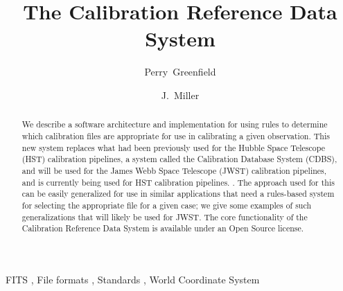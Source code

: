 \documentclass[final,authoryear,5p,times,twocolumn]{elsarticle}
\begin{document}
\begin{frontmatter}



\title{The Calibration Reference Data System}



\author[stsci]{Perry~Greenfield}
\author[stsci]{J.~Miller}

\address[stsci]{Space Telescope Science Institute, 3700 San Martin Drive, Baltimore, MD 21218, USA}

\begin{abstract}

We describe a software architecture and implementation for using rules to
determine which calibration files are appropriate for use in calibrating a
given observation. This new system replaces what had been previously used for
the Hubble Space Telescope (HST) calibration pipelines, a system called the
Calibration Database System (CDBS), and will be used for the James Webb Space
Telescope (JWST) calibration pipelines, and is currently being used for HST calibration pipelines. . The approach used for this can be
easily generalized for use in similar applications that need a rules-based
system for selecting the appropriate file for a given case; we give some
examples of such generalizations that will likely be used for JWST. The core
functionality of the Calibration Reference Data System is available under an
Open Source license.
\end{abstract}

\begin{keyword}


FITS \sep
File formats \sep
Standards \sep
World Coordinate System

\end{keyword}

\end{frontmatter}
\end{document}
